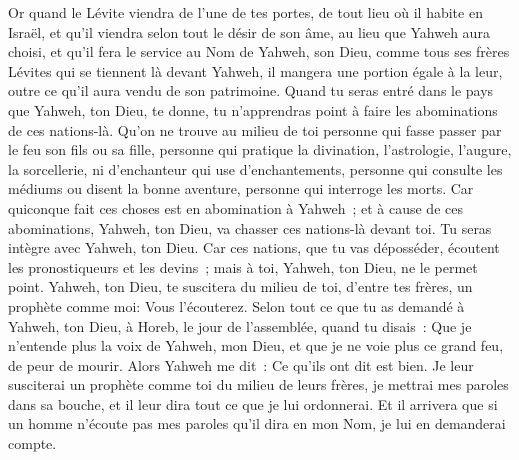 \begin{multicols}{2}
Or quand le Lévite viendra de l'une de tes portes, de tout lieu où il habite en Israël, et qu'il viendra selon tout le désir de son âme, au lieu que Yahweh aura choisi,
et qu'il fera le service au Nom de Yahweh, son Dieu, comme tous ses frères Lévites qui se tiennent là devant Yahweh,
il mangera une portion égale à la leur, outre ce qu'il aura vendu de son patrimoine.
Quand tu seras entré dans le pays que Yahweh, ton Dieu, te donne, tu n'apprendras point à faire les abominations de ces nations-là.
Qu'on ne trouve au milieu de toi personne qui fasse passer par le feu son fils ou sa fille, personne qui pratique la divination, l'astrologie, l'augure, la sorcellerie,
ni d'enchanteur qui use d'enchantements, personne qui consulte les médiums ou disent la bonne aventure, personne qui interroge les morts.
Car quiconque fait ces choses est en abomination à Yahweh~; et à cause de ces abominations, Yahweh, ton Dieu, va chasser ces nations-là devant toi.
Tu seras intègre avec Yahweh, ton Dieu.
Car ces nations, que tu vas déposséder, écoutent les pronostiqueurs et les devins~; mais à toi, Yahweh, ton Dieu, ne le permet point.
Yahweh, ton Dieu, te suscitera du milieu de toi, d'entre tes frères, un prophète comme moi: Vous l'écouterez.
Selon tout ce que tu as demandé à Yahweh, ton Dieu, à Horeb, le jour de l'assemblée, quand tu disais~: Que je n'entende plus la voix de Yahweh, mon Dieu, et que je ne voie plus ce grand feu, de peur de mourir.
Alors Yahweh me dit~: Ce qu'ils ont dit est bien.
Je leur susciterai un prophète comme toi du milieu de leurs frères, je mettrai mes paroles dans sa bouche, et il leur dira tout ce que je lui ordonnerai.
Et il arrivera que si un homme n'écoute pas mes paroles qu'il dira en mon Nom, je lui en demanderai compte.

\end{multicols}
